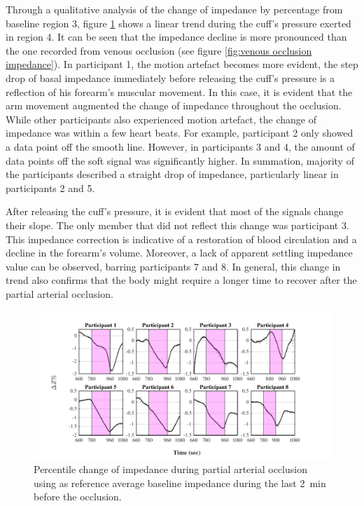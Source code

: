 Through a qualitative analysis of the change of impedance by percentage from baseline region 3, figure \ref{fig:arterial occlusion impedance} shows a linear trend during the cuff's pressure exerted in region 4. It can be seen that the impedance decline is more pronounced than the one recorded from venous occlusion (see figure \ref{fig:venous occlusion impedance}). In participant 1, the motion artefact becomes more evident, the step drop of basal impedance immediately before releasing the cuff's pressure is a reflection of his forearm's muscular movement. In this case, it is evident that the arm movement augmented the change of impedance throughout the occlusion. While other participants also experienced motion artefact, the change of impedance was within a few heart beats. For example, participant 2 only showed a data point off the smooth line. However, in participants 3 and 4, the amount of data points off the soft signal was significantly higher. In summation, majority of the participants described a straight drop of impedance, particularly linear in participants 2 and 5. 

After releasing the cuff's pressure, it is evident that most of the signals change their slope. The only member that did not reflect this change was participant 3. This impedance correction is indicative of a restoration of blood circulation and a decline in the forearm's volume. Moreover, a lack of apparent settling impedance value can be observed, barring participants 7 and 8. In general, this change in trend also confirms that the body might require a longer time to recover after the partial arterial occlusion.

\begin{figure}[htbp]
	\centering
	\includegraphics[width=15cm,keepaspectratio]{figure_vop_5}    
	\caption[Percentile variation of impedance during partial arterial occlusion]{Percentile change of impedance during partial arterial occlusion using as reference average baseline impedance during the last \SI{2}{\minute} before the occlusion.}
	\label{fig:arterial occlusion impedance}
\end{figure}  

